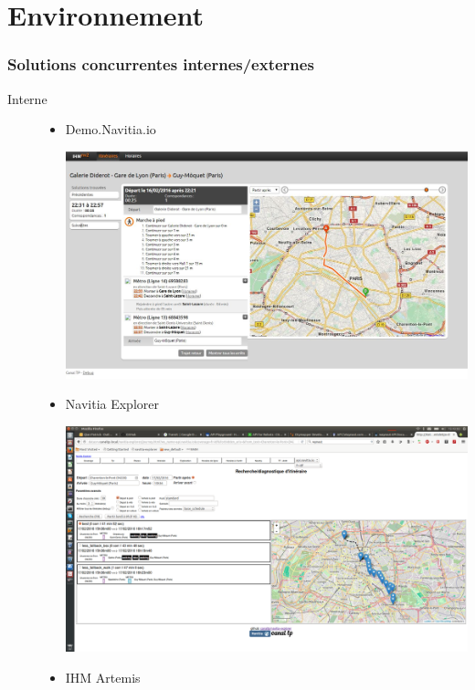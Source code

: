\documentclass[table]{beamer}
\begin{document}
\section{Environnement}

\begin{frame}
  \frametitle{Solutions concurrentes internes/externes}
  \begin{description}
    \item[Interne]
      \begin{itemize} 
        \item Demo.Navitia.io
           \begin{center}
              \includegraphics[height=0.22\textheight]{images/demo_navitia_io}
           \end{center}
        \item Navitia Explorer
           \begin{center}
             \includegraphics[height=0.22\textheight]{images/navitia-explorer}
           \end{center}
        \item IHM Artemis
          \begin{center}

\end{center}
\end{itemize}
\end{description}
\end{frame}
\end{document}
